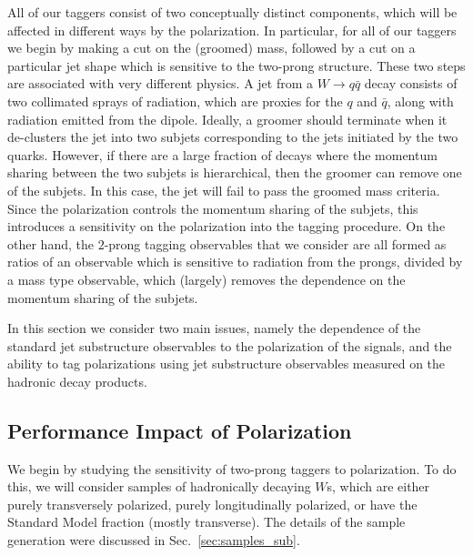 \documentclass[11pt,letterpaper]{article}
\DeclareRobustCommand{\Sec}[1]{Sec.~\ref{#1}}
\begin{document}
All of our taggers consist of two conceptually distinct components, which will be affected in different ways by the polarization.
%
In particular, for all of our taggers we begin by making a cut on the (groomed) mass, followed by a cut on a particular jet shape which is sensitive to the two-prong structure. These two steps are associated with very different physics. A jet from a $W\to q\bar q$ decay consists of two collimated sprays of radiation, which are proxies for the $q$ and $\bar q$, along with radiation emitted from the dipole.
%
Ideally, a groomer should terminate when it de-clusters the jet into two subjets corresponding to the jets initiated by the two quarks.
%
However, if there are a large fraction of decays where the momentum sharing between the two subjets is hierarchical, then the groomer can remove one of the subjets.
%
In this case, the jet will fail to pass the groomed mass criteria.
%
Since the polarization controls the momentum sharing of the subjets, this introduces a sensitivity on the polarization into the tagging procedure.
%
On the other hand, the $2$-prong tagging observables that we consider are all formed as ratios of an observable which is sensitive to radiation from the prongs, divided by a mass type observable, which (largely) removes the dependence on the momentum sharing of the subjets.


In this section we consider two main issues, namely
the dependence of the standard jet substructure observables to the
polarization of the signals, and the ability to tag polarizations
using jet substructure observables measured on the hadronic decay
products.

\subsection{Performance Impact of Polarization}\label{sec:polar_robust}


We begin by studying the sensitivity of two-prong taggers to polarization. To do this, we will consider samples of hadronically decaying $W$s, which are either purely transversely polarized, purely longitudinally polarized, or have the Standard Model fraction (mostly transverse). The details of the sample generation were discussed in \Sec{sec:samples_sub}.
\end{document}
